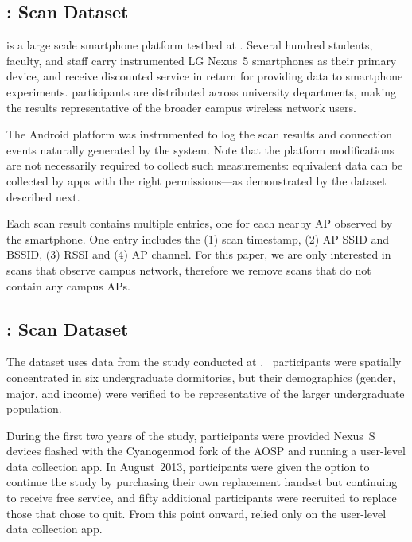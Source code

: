 \subsection{\ubscan{}: \PhoneLab{} \wifi{} Scan Dataset}
\label{sec:phonelab}

\PhoneLab{} is a large scale smartphone platform testbed at \ub{}. Several
hundred students, faculty, and staff carry instrumented LG Nexus~5 smartphones
as their primary device, and receive discounted service in return for providing
data to smartphone experiments. \PhoneLab{} participants are distributed across
university departments, making the results representative of the broader campus
wireless network users.

The \PhoneLab{} Android platform was instrumented to log the \wifi{} scan
results and \wifi{} connection events naturally generated by the system.
Note that the platform modifications are not necessarily required to collect such
measurements: equivalent data can be collected by apps with the right
permissions---as demonstrated by the \ndscan{} dataset described next.

Each scan result contains multiple entries, one for each nearby
\wifi{} AP observed by the smartphone. One entry includes the
(1) scan timestamp, (2) AP SSID and BSSID, (3) RSSI and (4) AP channel. For
this paper, we are only interested in scans that observe \ub{} campus
network, therefore we remove scans that do not contain any \ub{} campus APs.


\subsection{\ndscan{}: \NetSense{} \wifi{} Scan Dataset}
\label{sec:netsense}

The \ndscan{} dataset uses data from the \NetSense{} study
conducted at \nd{}.
\NetSense{}~participants were spatially concentrated in six undergraduate
dormitories, but their demographics (gender, major, and income) were verified
to be representative of the larger undergraduate population.

During the first two years of the study, \NetSense{} participants were
provided Nexus~S devices flashed with the Cyanogenmod fork of the AOSP and
running a user-level data collection app. In August~2013, participants were
given the option to continue the study by purchasing their own replacement
handset but continuing to receive free service, and fifty additional
participants were recruited to replace those that chose to quit. From this
point onward, \NetSense{} relied only on the user-level data collection app.

